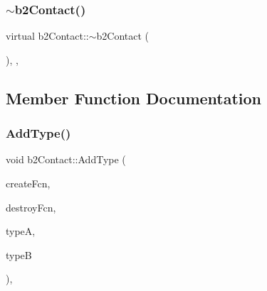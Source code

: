 \subsubsection{\texorpdfstring{$\sim$b2Contact()}{~b2Contact()}}
{\footnotesize\ttfamily virtual b2\+Contact\+::$\sim$b2\+Contact (\begin{DoxyParamCaption}{ }\end{DoxyParamCaption})\hspace{0.3cm}{\ttfamily [inline]}, {\ttfamily [protected]}, {\ttfamily [virtual]}}



\subsection{Member Function Documentation}
\mbox{\label{classb2_contact_ad905650aab96ead0434c2bb449e4129c}} 
\subsubsection{\texorpdfstring{AddType()}{AddType()}}
{\footnotesize\ttfamily void b2\+Contact\+::\+Add\+Type (\begin{DoxyParamCaption}\item[{\mbox{\hyperlink{b2_contact_8h_a8c349419089565d4b718438978e2e098}{b2\+Contact\+Create\+Fcn}} $\ast$}]{create\+Fcn,  }\item[{\mbox{\hyperlink{b2_contact_8h_a13f1fcd7bbd3900e53e6ddf8a76428e7}{b2\+Contact\+Destroy\+Fcn}} $\ast$}]{destroy\+Fcn,  }\item[{\mbox{\hyperlink{classb2_shape_a4c1f3a9ad6b3150bb90ad9018ca4b1e0}{b2\+Shape\+::\+Type}}}]{typeA,  }\item[{\mbox{\hyperlink{classb2_shape_a4c1f3a9ad6b3150bb90ad9018ca4b1e0}{b2\+Shape\+::\+Type}}}]{typeB }\end{DoxyParamCaption})\hspace{0.3cm}{\ttfamily [static]}, {\ttfamily [protected]}}

\mbox{\label{classb2_contact_a2de75f3569a0f962cf1e6e1b6384c0a1}} 
